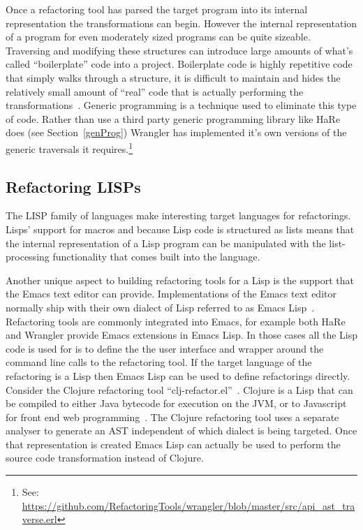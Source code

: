 Once a refactoring tool has parsed the target program into its internal representation the transformations can begin. However the internal representation of a program for even moderately sized programs can be quite sizeable. Traversing and modifying these structures can introduce large amounts of what's called ``boilerplate'' code into a project. Boilerplate code is highly repetitive code that simply walks through a structure, it is difficult to maintain and hides the relatively small amount of ``real'' code that is actually performing the transformations~\citep{syb}. Generic programming is a technique used to eliminate this type of code. Rather than use a third party generic programming library like HaRe does (see Section~\ref{genProg}) Wrangler has implemented it's own versions of the generic traversals it requires.\footnote{See: \url{https://github.com/RefactoringTools/wrangler/blob/master/src/api_ast_traverse.erl}}

\subsection{Refactoring LISPs}

The LISP family of languages make interesting target languages for refactorings. Lisps' support for macros and because Lisp code is structured as lists means that the internal representation of a Lisp program can be manipulated with the list-processing functionality that comes built into the language. 

Another unique aspect to building refactoring tools for a Lisp is the support that the Emacs text editor can provide. Implementations of the Emacs text editor normally ship with their own dialect of Lisp referred to as Emacs Lisp~\citep{emacs}. Refactoring tools are commonly integrated into Emacs, for example both HaRe and Wrangler provide Emacs extensions in Emacs Lisp. In those cases all the Lisp code is used for is to define the the user interface and wrapper around the command line calls to the refactoring tool. If the target language of the refactoring is a Lisp then Emacs Lisp can be used to define refactorings directly. Consider the Clojure refactoring tool ``clj-refactor.el''~\citep{clojureRefac}. Clojure is a Lisp that can be compiled to either Java bytecode for execution on the JVM, or to Javascript for front end web programming~\citep{clojure}. The Clojure refactoring tool uses a separate analyser to generate an AST independent of which dialect is being targeted. Once that representation is created Emacs Lisp can actually be used to perform the source code transformation instead of Clojure.    

